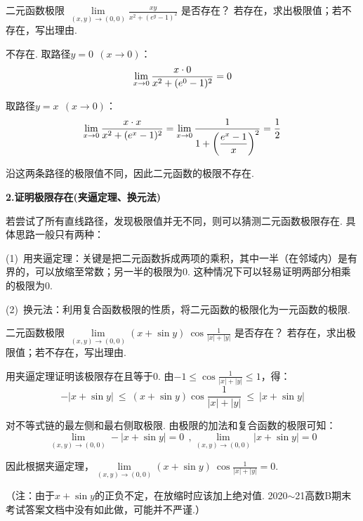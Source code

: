 \begin{example}[2022 B卷]
\label{ex:ch06-03}
二元函数极限
$\lim\limits_{\scriptscriptstyle{(x,y)\to (0,0)} }\frac{xy}{x^2 + (e^y - 1)^2}$
是否存在？
若存在，求出极限值；若不存在，写出理由.
\end{example}

\begin{solution}
不存在. 取路径$y = 0 ~~(x \to 0)$：
$$
\limx0 \frac{x \cdot 0}{x^2+ (e^0 - 1)^2} = 0
$$\par
取路径$y = x~~(x \to 0)$：
$$
\limx0 \frac{x \cdot x}{x^2 + (e^x -1)^2} = \limx0 \frac{1}{1 + \left( \displaystyle\frac{e^x - 1}{x} \right)^2} = \frac{1}{2}
$$\par
沿这两条路径的极限值不同，因此二元函数的极限不存在.
\end{solution}

\textbf{2.证明极限存在(夹逼定理、换元法)} \vspace{0.25em}

若尝试了所有直线路径，发现极限值并无不同，则可以猜测二元函数极限存在. 具体思路一般只有两种：\par
(1)~用夹逼定理：关键是把二元函数拆成两项的乘积，其中一半（在邻域内）是有界的，可以放缩至常数；另一半的极限为0.
这种情况下可以轻易证明两部分相乘的极限为0.\par
(2)~换元法：利用复合函数极限的性质，将二元函数的极限化为一元函数的极限.

\begin{example}[2020]
\label{ex:ch06-04}
二元函数极限
$\lim\limits_{\scriptscriptstyle{(x,y)\to (0,0)} } (x + \sin y) ~\cos \frac{1}{|x|+|y|}$
是否存在？
若存在，求出极限值；若不存在，写出理由.
\end{example}

\begin{solution}
用夹逼定理证明该极限存在且等于$0$. 由$-1 \le \cos \frac{1}{|x|+|y|} \le 1$，得：
$$
-|x+\sin y| ~\le~ (x+\sin y) \cos \frac{1}{|x|+|y|} ~\le~ \left| x+\sin y \right|
$$\par
对不等式链的最左侧和最右侧取极限. 由极限的加法和复合函数的极限可知：
$$
\lim\limits_{\scriptscriptstyle{(x,y)\to (0,0)} } -|x+\sin y| = 0~~,
\lim\limits_{\scriptscriptstyle{(x,y)\to (0,0)} } |x+\sin y| = 0
$$

因此根据夹逼定理，$\lim\limits_{\scriptscriptstyle{(x,y)\to (0,0)} } (x + \sin y) ~\cos \frac{1}{|x|+|y|} = 0$.
\end{solution}

（注：由于$x + \sin y$的正负不定，在放缩时应该加上绝对值.
2020$\sim$21高数B期末考试答案文档中没有如此做，可能并不严谨.）

